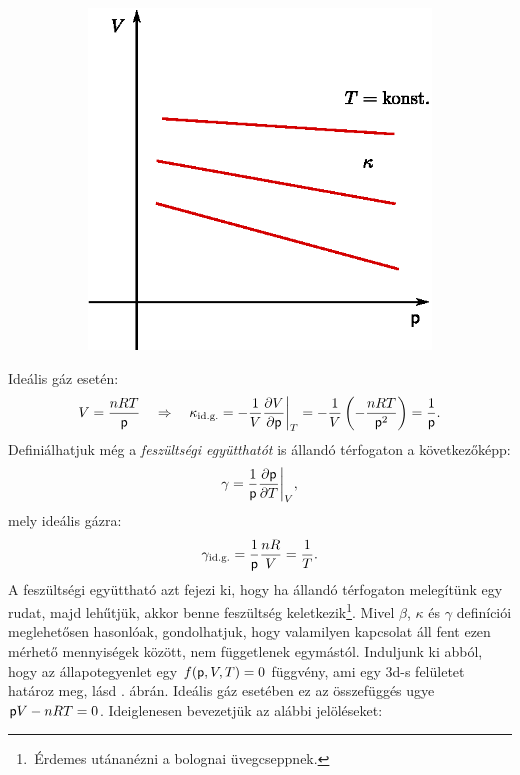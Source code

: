 \begin{figure}[htb]
\begin{subfigure}[b]{0.45\textwidth}
            \includegraphics[width=\textwidth]{termo_2/termo_2_4}
            \label{fig:termo_2_4}
    \end{subfigure}
    \end{figure}
    \FloatBarrier
Ideális gáz esetén:
\begin{align}
    V = \frac{nRT}{\mathsf p} \quad\Rightarrow\quad \kappa_{\textnormal{id.g.}} = -\frac{1}{V} \frac{\partial{V}}{\partial{\mathsf p}}\bigg|_T = -\frac{1}{V} \left({-\frac{nRT}{\mathsf p^2}}\right)= \frac{1}{\mathsf p}.
\end{align}
Definiálhatjuk még a \emph{feszültségi együtthatót} is állandó térfogaton a következőképp:
\begin{align}
    \gamma = \frac{1}{\mathsf p} \frac{\partial{\mathsf p}}{\partial{T}}\bigg|_V,
\end{align}
mely ideális gázra:
\begin{align}
    \gamma_{\textnormal{id.g.}} = \frac{1}{\mathsf p}\frac{nR}{V} = \frac{1}{T}.
\end{align}
A feszültségi együttható azt fejezi ki, hogy ha állandó térfogaton melegítünk egy rudat, majd lehűtjük, akkor benne feszültség keletkezik\footnote{\,Érdemes utánanézni a bolognai üvegcseppnek.}.
Mivel $\beta$, $\kappa$ és $\gamma$ definíciói meglehetősen hasonlóak, gondolhatjuk, hogy valamilyen kapcsolat áll fent ezen mérhető mennyiségek között, nem függetlenek egymástól. Induljunk ki abból, hogy az állapotegyenlet egy $f(\mathsf p,V,T)=0$ függvény, ami egy 3d-s felületet határoz meg, lásd . ábrán. Ideális gáz esetében ez az összefüggés ugye $\mathsf p V-nRT=0$. Ideiglenesen bevezetjük az alábbi jelöléseket:
